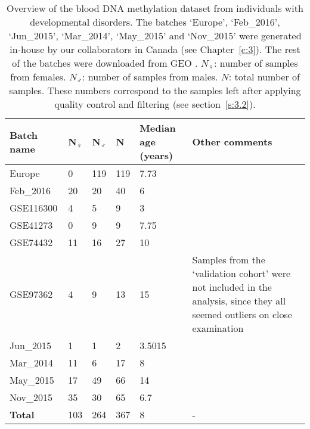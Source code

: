 \begin{table}[h]
	\centering
	\small
	\begin{tabular}{ p{2cm} p{1cm} p{1cm} p{1cm} p{2cm} p{6cm} }
		\toprule
		\textbf{Batch name} & \textbf{N$_{\female}$} & \textbf{N$_{\male}$} & \textbf{N} & \textbf{Median age (years)} & \textbf{Other comments} \\
		\midrule
		  Europe & 0 & 119 & 119 & 7.73 & \\
		  Feb\_2016 & 20 & 20 & 40 & 6 & \\
		  GSE116300 & 4 & 5 & 9 & 3 &\\
		  GSE41273 & 0 & 9 & 9 & 7.75 & \\
		  GSE74432 & 11 & 16 & 27 & 10 & \\
		  GSE97362 & 4 & 9 & 13 & 15 & Samples from the `validation cohort' were not included in the analysis, since they all seemed outliers on close examination\\
		  Jun\_2015 & 1 & 1 & 2 & 3.5015 & \\
		  Mar\_2014 & 11 & 6 & 17 & 8 & \\
		  May\_2015 & 17 & 49 & 66 & 14 & \\
		  Nov\_2015 & 35 & 30 & 65 & 6.7 & \\
		\midrule
		\textbf{Total} & 103 & 264 & 367 & 8 & - \\ 
		\bottomrule
	\end{tabular}
	\vspace*{3mm}
	\caption[Additional information for the developmental disorders dataset]{Overview of the blood DNA methylation dataset from individuals with developmental disorders. The batches `Europe', `Feb\_2016', `Jun\_2015', `Mar\_2014', `May\_2015' and `Nov\_2015' were generated in-house by our collaborators in Canada (see Chapter~\ref{c:3}). The rest of the batches were downloaded from GEO \citep{Edgar2002}. $N_{\female}$: number of samples from females. $N_{\male}$: number of samples from males. $N$: total number of samples. These numbers correspond to the samples left after applying quality control and filtering (see section~\ref{s:3.2}).}
	\label{table:s2_table1}
\end{table} 

\smallskip

\clearpage

